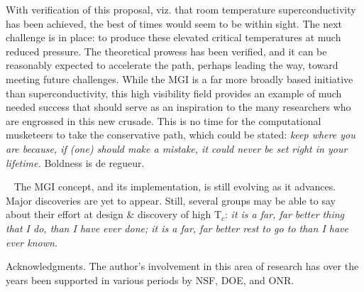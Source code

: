 \documentclass[aps,prb,twocolumn,groupedaddress]{revtex4}
\begin{document}
With verification of this proposal, viz. that room temperature superconductivity 
has been achieved, the best of times would seem to be within sight. The next 
challenge is in place: to produce these elevated critical temperatures at much 
reduced pressure. The theoretical prowess has been verified, and it can be 
reasonably expected to accelerate the path, perhaps leading the way, toward 
meeting future challenges. While the MGI is a far more broadly based initiative 
than superconductivity, this high visibility field provides 
an example of much needed success 
that should serve as an inspiration to the many researchers who are engrossed 
in this new crusade. This is no time for the computational musketeers to take 
the conservative path, which could be stated: {\it keep where you are because, 
if (one) should make a mistake, it could never be set right in your lifetime.}
 Boldness is de regueur.

~
\vskip 3mm
The MGI concept, and its implementation, is still evolving as it advances. 
Major discoveries are yet to appear. Still, several groups may be able to say 
about their effort at design \& discovery of high T$_c$: {\it it is a far, 
far better thing that I do, than I have ever done; it is a far, far better 
rest to go to than I have ever known.}


Acknowledgments. 
The author's involvement in this area of research has over the years
been supported in various periods by NSF, DOE, and ONR.
\end{document}
